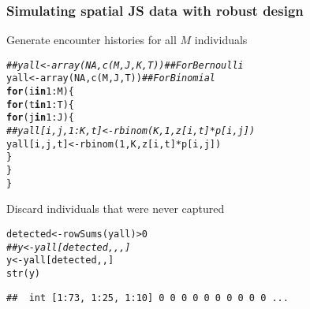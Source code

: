 \documentclass[color=usenames,dvipsnames]{beamer}\usepackage[]{graphicx}\usepackage[]{color}
\makeatletter
\newcommand{\hlnum}[1]{\textcolor[rgb]{0.69,0.494,0}{#1}}%
\newcommand{\hlcom}[1]{\textcolor[rgb]{0.514,0.506,0.514}{\textit{#1}}}%
\newcommand{\hlopt}[1]{\textcolor[rgb]{0,0,0}{#1}}%
\newcommand{\hlstd}[1]{\textcolor[rgb]{0,0,0}{#1}}%
\newcommand{\hlkwa}[1]{\textcolor[rgb]{0,0,0}{\textbf{#1}}}%
\newcommand{\hlkwb}[1]{\textcolor[rgb]{0,0.341,0.682}{#1}}%
\newcommand{\hlkwd}[1]{\textcolor[rgb]{0.004,0.004,0.506}{#1}}%
\newenvironment{kframe}{%
 \def\at@end@of@kframe{}%
 \ifinner\ifhmode%
  \def\at@end@of@kframe{\end{minipage}}%
  \begin{minipage}{\columnwidth}%
 \fi\fi%
 \def\FrameCommand##1{\hskip\@totalleftmargin \hskip-\fboxsep
 \colorbox{shadecolor}{##1}\hskip-\fboxsep
     \hskip-\linewidth \hskip-\@totalleftmargin \hskip\columnwidth}%
 \MakeFramed {\advance\hsize-\width
   \@totalleftmargin\z@ \linewidth\hsize
   \@setminipage}}%
 {\par\unskip\endMakeFramed%
 \at@end@of@kframe}
\newenvironment{knitrout}{}{} %
\makeatother
\begin{document}
\begin{frame}[fragile]
  \frametitle{Simulating spatial JS data with robust design}
{Generate encounter histories for all $M$ individuals}
\begin{knitrout}\footnotesize
{}\color{fgcolor}\begin{kframe}
\begin{alltt}
\hlcom{##yall <- array(NA, c(M, J, K, T))   ## For Bernoulli}
\hlstd{yall} \hlkwb{<-} \hlkwd{array}\hlstd{(}\hlnum{NA}\hlstd{,} \hlkwd{c}\hlstd{(M, J, T))}        \hlcom{## For Binomial}
\hlkwa{for}\hlstd{(i} \hlkwa{in} \hlnum{1}\hlopt{:}\hlstd{M) \{}
    \hlkwa{for}\hlstd{(t} \hlkwa{in} \hlnum{1}\hlopt{:}\hlstd{T) \{}
        \hlkwa{for}\hlstd{(j} \hlkwa{in} \hlnum{1}\hlopt{:}\hlstd{J) \{}
\hlcom{##            yall[i,j,1:K,t] <- rbinom(K, 1, z[i,t]*p[i,j])}
            \hlstd{yall[i,j,t]} \hlkwb{<-} \hlkwd{rbinom}\hlstd{(}\hlnum{1}\hlstd{, K, z[i,t]}\hlopt{*}\hlstd{p[i,j])}
        \hlstd{\}}
    \hlstd{\}}
\hlstd{\}}
\end{alltt}
\end{kframe}
\end{knitrout}
\pause
\vfill
{\normalsize Discard individuals that were never captured}
\begin{knitrout}\footnotesize
{}\color{fgcolor}\begin{kframe}
\begin{alltt}
\hlstd{detected} \hlkwb{<-} \hlkwd{rowSums}\hlstd{(yall)} \hlopt{>} \hlnum{0}
\hlcom{## y <- yall[detected,,,]}
\hlstd{y} \hlkwb{<-} \hlstd{yall[detected,,]}
\hlkwd{str}\hlstd{(y)}
\end{alltt}
\begin{verbatim}
##  int [1:73, 1:25, 1:10] 0 0 0 0 0 0 0 0 0 0 ...
\end{verbatim}
\end{kframe}
\end{knitrout}
\end{frame}






\end{document}
